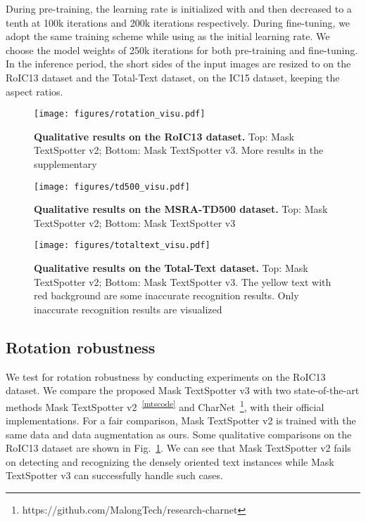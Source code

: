 \documentclass[runningheads]{llncs}
\begin{document}
During pre-training, the learning rate is initialized with  and then decreased to a tenth at 100k iterations and 200k iterations respectively. During fine-tuning, we adopt the same training scheme while using  as the initial learning rate. We choose the model weights of 250k iterations for both pre-training and fine-tuning.
In the inference period, the short sides of the input images are resized to  on the RoIC13 dataset and the Total-Text dataset,  on the IC15 dataset, keeping the aspect ratios.

\begin{figure}[ht]
    \centering
    \texttt{[image: figures/rotation\_visu.pdf]}
    \caption{\textbf{Qualitative results on the RoIC13 dataset.} Top: Mask TextSpotter v2; Bottom: Mask TextSpotter v3. More results in the supplementary}
    \label{fig:rotation-visu}
\end{figure}

\begin{figure}[ht]
    \centering
    \texttt{[image: figures/td500\_visu.pdf]}
    \caption{\textbf{Qualitative results on the MSRA-TD500 dataset.} Top: Mask TextSpotter v2; Bottom: Mask TextSpotter v3}
    \label{fig:td500_visu}
\end{figure}

\begin{figure}[ht]
    \centering
    \texttt{[image: figures/totaltext\_visu.pdf]}
    \caption{\textbf{Qualitative results on the Total-Text dataset.} Top: Mask TextSpotter v2; Bottom: Mask TextSpotter v3. The yellow text with red background are some inaccurate recognition results. Only inaccurate recognition results are visualized}
    \label{fig:shape_visu}
\end{figure}

\subsection{Rotation robustness}
We test for rotation robustness by conducting experiments on the RoIC13 dataset. We compare the proposed Mask TextSpotter v3 with two state-of-the-art methods Mask TextSpotter v2~\textsuperscript{\ref{mtscode}} and CharNet~\footnote{https://github.com/MalongTech/research-charnet}, with their official implementations. For a fair comparison, Mask TextSpotter v2 is trained with the same data and data augmentation as ours. Some qualitative comparisons on the RoIC13 dataset are shown in Fig.~\ref{fig:rotation-visu}. We can see that Mask TextSpotter v2 fails on detecting and recognizing the densely oriented text instances while Mask TextSpotter v3 can successfully handle such cases.
\end{document}
